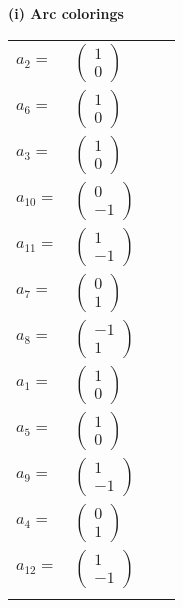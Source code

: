 \documentclass[1p]{elsarticle_modified}
\theoremstyle{definition}
\begin{document}
\flushleft \textbf{(i) Arc colorings}\\
\begin{tabular}{m{7pt} m{180pt} m{7pt} m{180pt} }
\flushright $a_{2}=$&$\begin{pmatrix}1\\0\end{pmatrix}$ \\
\flushright $a_{6}=$&$\begin{pmatrix}1\\0\end{pmatrix}$ \\
\flushright $a_{3}=$&$\begin{pmatrix}1\\0\end{pmatrix}$ \\
\flushright $a_{10}=$&$\begin{pmatrix}0\\-1\end{pmatrix}$ \\
\flushright $a_{11}=$&$\begin{pmatrix}1\\-1\end{pmatrix}$ \\
\flushright $a_{7}=$&$\begin{pmatrix}0\\1\end{pmatrix}$ \\
\flushright $a_{8}=$&$\begin{pmatrix}-1\\1\end{pmatrix}$ \\
\flushright $a_{1}=$&$\begin{pmatrix}1\\0\end{pmatrix}$ \\
\flushright $a_{5}=$&$\begin{pmatrix}1\\0\end{pmatrix}$ \\
\flushright $a_{9}=$&$\begin{pmatrix}1\\-1\end{pmatrix}$ \\
\flushright $a_{4}=$&$\begin{pmatrix}0\\1\end{pmatrix}$ \\
\flushright $a_{12}=$&$\begin{pmatrix}1\\-1\end{pmatrix}$\\&\end{tabular}
\end{document}
